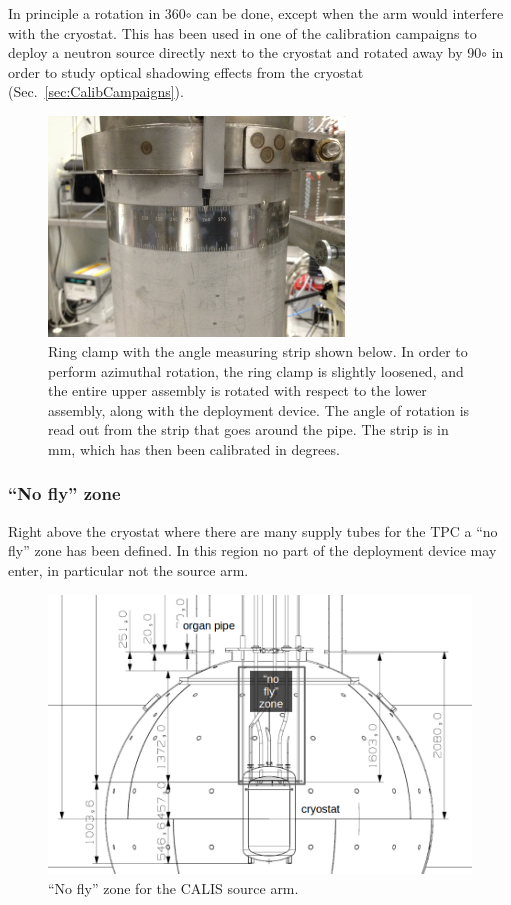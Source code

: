 In principle a rotation in 360$\circ$ can be done, except when the arm would interfere with the cryostat. This has been used in one of the calibration campaigns to deploy a neutron source directly next to the cryostat and rotated away by 90$\circ$ in order to study optical shadowing effects from the cryostat (Sec.~\ref{sec:CalibCampaigns}). 



\begin{figure}[htbp]
 \centering
  \includegraphics[width=0.7\textwidth]{Figures/RingClamp_WithPin_IMG_2669.JPG}
  \caption{Ring clamp  with the angle measuring strip shown below. In order to perform azimuthal rotation, the ring clamp is slightly loosened, and the entire upper assembly is rotated with respect to the lower assembly, along with the deployment device. The angle of rotation is read out from the strip that goes around the pipe. The strip is in mm, which has then been calibrated in degrees.}
  \label{fig:ring_clamp}
\end{figure} 

\subsubsection{``No fly'' zone}
Right above the cryostat where there are many supply tubes for the TPC a ``no fly'' zone has been defined. In this region no part of the deployment device may enter, in particular not the source arm.

\begin{figure}[htbp]
 \centering
  \includegraphics[scale=0.5]{Figures/NoFlyZone.png}
  \caption{``No fly'' zone for the CALIS source arm.}
  \label{fig:NoFlyZone}
\end{figure} 

